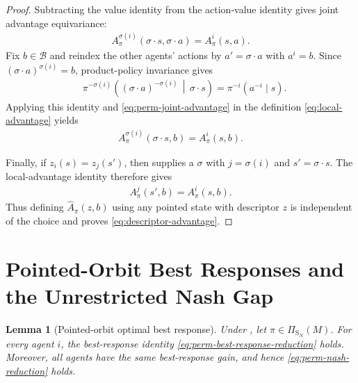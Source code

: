 \documentclass{article}
\theoremstyle{plain}
\newtheorem{lemma}[theorem]{Lemma}
\theoremstyle{definition}
\theoremstyle{remark}
\newcommand{\Sym}{\mathrm{S}}
\begin{document}
\begin{proof}
Subtracting the value identity from the action-value identity gives joint
advantage equivariance:
\begin{align}
  A^{\sigma(i)}_\pi(
    \sigma\mathbin{\cdot}s,\sigma\mathbin{\cdot}a)
  =
  A^i_\pi(s,a).
  \label{eq:perm-joint-advantage}
\end{align}
Fix $b\in\mathcal B$ and reindex the other agents' actions by
$a'\!=\sigma\mathbin{\cdot}a$ with $a^i=b$. Since
$(\sigma\mathbin{\cdot}a)^{\sigma(i)}=b$, product-policy invariance gives
\begin{align*}
  &\pi^{-\sigma(i)}\!\left(
    (\sigma\mathbin{\cdot}a)^{-\sigma(i)}
    \,\middle|\,
    \sigma\mathbin{\cdot}s
  \right)
  =
  \pi^{-i}(a^{-i}\mid s).
\end{align*}
Applying this identity and \eqref{eq:perm-joint-advantage} in the definition
\eqref{eq:local-advantage} yields
\begin{align*}
  A^{\sigma(i)}_\pi(\sigma\mathbin{\cdot}s,b)
  =
  A^i_\pi(s,b).
\end{align*}

Finally, if $z_i(s)=z_j(s')$, then
 supplies a $\sigma$ with
$j=\sigma(i)$ and $s'=\sigma\mathbin{\cdot}s$. The local-advantage identity
therefore gives
\begin{align*}
  A^j_\pi(s',b)
  =
  A^i_\pi(s,b).
\end{align*}
Thus defining $\widehat A_\pi(z,b)$ using any pointed state with descriptor
$z$ is independent of the choice and proves \eqref{eq:descriptor-advantage}.
\end{proof}

\section{Pointed-Orbit Best Responses and the Unrestricted Nash Gap}
\label{app:proof-perm-best-response}

\begin{lemma}[Pointed-orbit optimal best response]
\label{lemma:perm-best-response}
Under , let
$\pi\in\Pi_{\Sym_N}(M)$. For every agent $i$, the best-response identity
\eqref{eq:perm-best-response-reduction} holds. Moreover, all agents have the same
best-response gain, and hence \eqref{eq:perm-nash-reduction} holds.
\end{lemma}
\end{document}
